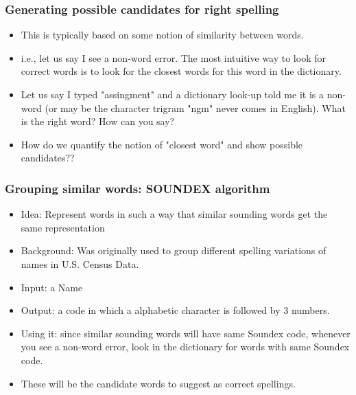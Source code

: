 \documentclass{beamer}
\begin{document}
\begin{frame}
\frametitle{Generating possible candidates for right spelling}
\begin{itemize}
\item This is typically based on some notion of similarity between words.
\item i.e., let us say I see a non-word error. The most intuitive way to look for correct words is to look for the closest words for this word in the dictionary. \pause
\item Let us say I typed "assingment" and a dictionary look-up told me it is a non-word (or may be the character trigram "ngm" never comes in English). What is the right word? How can you say?  \pause
\item How do we quantify the notion of "closest word" and show possible candidates??
\end{itemize}
\end{frame}

\begin{frame}
\frametitle{Grouping similar words: SOUNDEX algorithm}
\begin{itemize}
\item Idea: Represent words in such a way that similar sounding words get the same representation
\item Background: Was originally used to group different spelling variations of names in U.S. Census Data.
\item Input: a Name 
\item Output: a code in which a alphabetic character is followed by 3 numbers. 
\item Using it: since similar sounding words will have same Soundex code, whenever you see a non-word error, look in the dictionary for words with same Soundex code.
\item These will be the candidate words to suggest as correct spellings. 
\end{itemize}
\end{frame}
\end{document}
